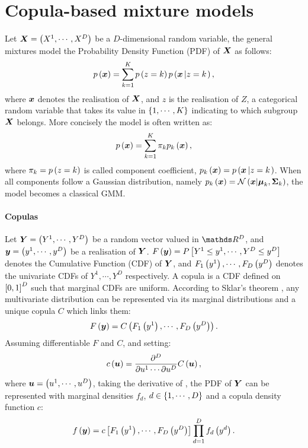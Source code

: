 \section{Copula-based mixture models}
\label{sec:Copula-based mixture models}

Let $\boldsymbol{X} = \left(X^1,\cdots,X^D\right)$ be a $D$-dimensional random variable, the general mixtures model the Probability Density Function (PDF) of $\boldsymbol{X}$ as follows:
\begin{equation}
    \label{eq:general mixture}
    p\left(\boldsymbol{x}\right) = \sum_{k=1}^K  p\left(z=k\right) p\left( \boldsymbol{x} \left| z=k \right.\right),
\end{equation}
\sloppy where $\boldsymbol{x}$ denotes the realisation of $\boldsymbol{X}$, and $z$ is the realisation of $Z$, a categorical random variable
that takes its value in $\left\{1,\cdots,K\right\}$ indicating to which subgroup $\boldsymbol{X}$ belongs.
More concisely the model is often written as:
\begin{equation}
    \label{eq:concise general mixture}
    p\left(\boldsymbol{x}\right) = \sum_{k=1}^K  \pi_k p_k\left(\boldsymbol{x}\right),
\end{equation}
where $\pi_k = p\left(z=k\right)$ is called component coefficient,  $p_k\left(\boldsymbol{x}\right) = p\left( \boldsymbol{x} \left| z=k \right.\right)$. When all components follow a Gaussian distribution, namely $p_k\seq{\x}=\Norm\seq{\blueC \x | \bsmu_k, \bsSigma_k}$, %
the model becomes a classical GMM. 

\paragraph{Copulas} Let $\boldsymbol{Y} = \left(Y^1, \cdots, Y^D\right)$ be a random vector valued in $\Real^D$, and $\boldsymbol{y}=\left(y^1,\cdots,y^D\right)$ be a realisation of $\boldsymbol{Y}$. $F\seq{\y} = P\interv{Y^1\leq y^1, \cdots, Y^{\blueC D}\leq y^{\blueC D}}$ denotes the Cumulative  Function (CDF) of $\boldsymbol{Y}$, and $F_1\left(y^1\right), \cdots, F_D\left(y^D\right)$ denotes the univariate CDFs of $Y^1,\cdots,Y^D$ respectively. A copula is a CDF defined on $\left[0, 1\right]^D$ such that marginal CDFs are uniform. According to Sklar's theorem \cite{nelsen2007introduction}, any multivariate distribution can be represented via its marginal distributions and a unique copula $C$ which links them:
\begin{equation}
    \label{eq:copula definition}
    F\left(\boldsymbol{y}\right) = C\left(F_1\left(y^1\right),\cdots,F_D\left(y^D\right)\right).
\end{equation}
Assuming differentiable $F$ and $C$, and setting:
\begin{equation}
    \label{eq:copula pdf}
    c\seq{\u} = \frac{\partial^D}{\blueC{\partial u^1 \cdots \partial u^D}}C\seq{\u},
\end{equation}
where $\boldsymbol{u} = \left(u^1,\cdots, u^D\right)$, taking the derivative of \blueC{\eqref{eq:copula definition}}, the PDF of $\boldsymbol{Y}$ can be represented with marginal densities $f_d$, $d\in\left\{1,\cdots,D\right\}$ and a copula density function $c$: 
\begin{equation}
    \label{eq:pdf with copula}
    f\left(\boldsymbol{y}\right) = c\left[F_1\left(y^1\right),\cdots,F_D\left(y^D\right)\right]\prod_{d=1}^D f_d\left(y^d\right).
\end{equation}

